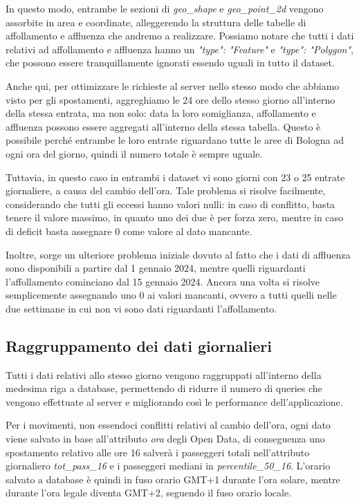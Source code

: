 In questo modo, entrambe le sezioni di \textit{geo\_shape} e \textit{geo\_point\_2d} vengono assorbite in area e coordinate, alleggerendo la struttura delle tabelle di affollamento e affluenza che andremo a realizzare. Possiamo notare che tutti i dati relativi ad affollamento e affluenza hanno un \textit{"type": "Feature"} e \textit{"type": "Polygon"}, che possono essere tranquillamente ignorati essendo uguali in tutto il dataset.

Anche qui, per ottimizzare le richieste al server nello stesso modo che abbiamo visto per gli spostamenti, aggreghiamo le 24 ore dello stesso giorno all'interno della stessa entrata, ma non solo: data la loro somiglianza, affollamento e affluenza possono essere aggregati all'interno della stessa tabella. Questo è possibile perché entrambe le loro entrate riguardano tutte le aree di Bologna ad ogni ora del giorno, quindi il numero totale è sempre uguale.

Tuttavia, in questo caso in entrambi i dataset vi sono giorni con 23 o 25 entrate giornaliere, a causa del cambio dell'ora. Tale problema si risolve facilmente, considerando che tutti gli eccessi hanno valori nulli: in caso di conflitto, basta tenere il valore massimo, in quanto uno dei due è per forza zero, mentre in caso di deficit basta assegnare 0 come valore al dato mancante.

Inoltre, sorge un ulteriore problema iniziale dovuto al fatto che i dati di affluenza sono disponibili a partire dal 1 gennaio 2024, mentre quelli riguardanti l'affollamento cominciano dal 15 gennaio 2024. Ancora una volta si risolve semplicemente assegnando uno 0 ai valori mancanti, ovvero a tutti quelli nelle due settimane in cui non vi sono dati riguardanti l'affollamento.

\subsection{Raggruppamento dei dati giornalieri}
Tutti i dati relativi allo stesso giorno vengono raggruppati all'interno della medesima riga a database, permettendo di ridurre il numero di queries che vengono effettuate al server e migliorando così le performance dell'applicazione.

Per i movimenti, non essendoci conflitti relativi al cambio dell'ora, ogni dato viene salvato in base all'attributo \textit{ora} degli Open Data, di conseguenza uno spostamento relativo alle ore 16 salverà i passeggeri totali nell'attributo giornaliero \textit{tot\_pass\_16} e i passeggeri mediani in \textit{percentile\_50\_16}. L'orario salvato a database è quindi in fuso orario GMT+1 durante l'ora solare, mentre durante l'ora legale diventa GMT+2, seguendo il fuso orario locale.

